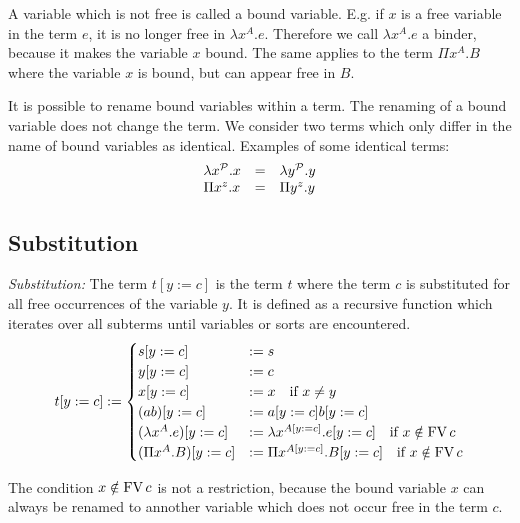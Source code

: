A variable which is not free is called a bound variable. E.g. if $x$ is a free
variable in the term $e$, it is no longer free in $\lambda x^A. e$. Therefore we
call $\lambda x^A. e$ a binder, because it makes the variable $x$ bound. The
same applies to the term $\Pi x^A. B$  where the variable $x$ is bound, but can
appear free in $B$.


It is possible to rename bound variables within a term. The renaming of a bound
variable does not change the term. We consider two terms which only differ in
the name of bound variables as identical. Examples of some identical terms:
$$
\begin{array}{lll}
    \lambda x^\Prop. x  &=& \lambda y^\Prop. y

    \\

    \Pi x^z. x   &=& \Pi y^z. y
\end{array}
$$



\subsection{Substitution}


\begin{definition}
    \emph{Substitution:}
    The term $t[y:=c]$ is the term $t$ where the term $c$ is substituted for all
    free occurrences of the variable $y$. It is defined as a recursive function
    which iterates over all subterms until variables or sorts are encountered.
    $$
    t[y:=c] :=
        \begin{cases}
            s[y:=c] &:= s

            \\

            y[y:=c] &:= c

            \\

            x[y:=c] &:= x \quad \text{if } x \ne y

            \\

            (a b)[y:=c] &:= a[y:=c] b[y:=c]

            \\

            (\lambda x^A . e)[y:=c]
            &:=
            \lambda x^{A[y:=c]}. e[y:=c]
                \quad \text{if } x \notin \FV c

            \\

            (\Pi x^A . B)[y:=c]
            &:=
            \Pi x^{A[y:=c]}. B[y:=c]
                \quad \text{if } x \notin \FV c
        \end{cases}
    $$
\end{definition}
The condition $x \notin \FV c$ is not a restriction, because the bound variable
$x$ can always be renamed to annother variable which does not occur free in the
term $c$.




